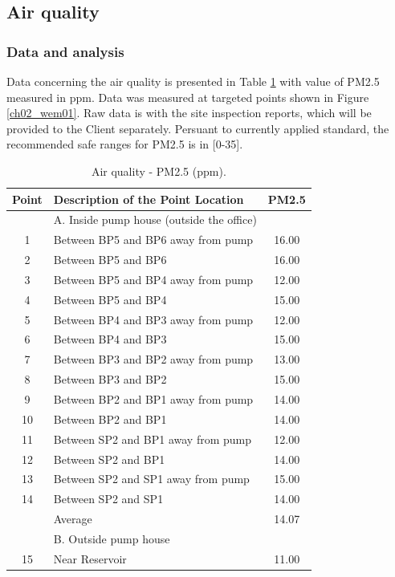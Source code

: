 \subsection{Air quality}\label{aq01}

\subsubsection{Data and analysis}
Data concerning the air quality is presented in Table \ref{ch04_tbl_wem03} with value of PM2.5 measured in ppm. Data was measured at targeted points shown in Figure \ref{ch02_wem01}. Raw data is with the site inspection reports, which will be provided to the Client separately. Persuant to currently applied standard, the recommended safe ranges for PM2.5 is in [0-35].

\begin{table}[h]
	\caption{Air quality - PM2.5 (ppm).}
	\label{ch04_tbl_wem03}
	{\footnotesize
\begin{tabular}{c|l|c}
	\hline
	Point & Description of the Point Location & PM2.5 \\ 
	\hline
	& A. Inside pump house (outside the office) &  \\ 
	1 & Between BP5 and BP6 away from pump & 16.00 \\ 
	2 & Between BP5 and BP6 & 16.00 \\ 
	3 & Between BP5 and BP4 away from pump & 12.00 \\ 
	4 & Between BP5 and BP4 & 15.00 \\ 
	5 & Between BP4 and BP3 away from pump & 12.00 \\ 
	6 & Between BP4 and BP3 & 15.00 \\ 
	7 & Between BP3 and BP2 away from pump & 13.00 \\ 
	8 & Between BP3 and BP2 & 15.00 \\ 
	9 & Between BP2 and BP1 away from pump & 14.00 \\ 
	10 & Between BP2 and BP1 & 14.00 \\ 
	11 & Between SP2 and BP1 away from pump & 12.00 \\ 
	12 & Between SP2 and BP1 & 14.00 \\ 
	13 & Between SP2 and SP1 away from pump & 15.00 \\ 
	14 & Between SP2 and SP1 & 14.00 \\ 
	& Average & 14.07 \\ 
	\hline
	& B. Outside pump house &  \\ 
	15 & Near Reservoir & 11.00 \\ 

\end{tabular}}
\end{table}
